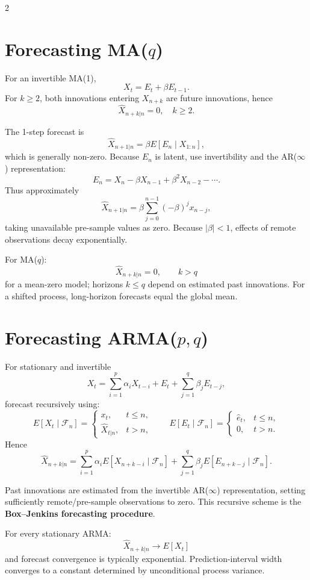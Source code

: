 \documentclass[9pt,a4paper]{extarticle}
\newcommand{\key}[1]{\textbf{#1}}
\begin{document}
\begin{multicols}{2}
\section{Forecasting MA($q$)}

For an invertible MA(1),
\[
X_t=E_t+\beta E_{t-1}.
\]
For \(k\ge2\), both innovations entering \(X_{n+k}\) are future innovations, hence
\[
\boxed{\widehat X_{n+k|n}=0,\quad k\ge2.}
\]

The 1-step forecast is
\[
\widehat X_{n+1|n}
=\beta E[E_n\mid X_{1:n}],
\]
which is generally non-zero. Because \(E_n\) is latent, use invertibility and the AR($\infty$) representation:
\[
E_n=X_n-\beta X_{n-1}
+\beta^2X_{n-2}-\cdots.
\]
Thus approximately
\[
\boxed{
\widehat X_{n+1|n}
=
\beta
\sum_{j=0}^{n-1}
(-\beta)^j x_{n-j},
}
\]
taking unavailable pre-sample values as zero. Because \(|\beta|<1\), effects of remote observations decay exponentially.

For MA($q$):
\[
\boxed{\widehat X_{n+k|n}=0,\qquad k>q}
\]
for a mean-zero model; horizons \(k\le q\) depend on estimated past innovations. For a shifted process, long-horizon forecasts equal the global mean.

\section{Forecasting ARMA($p,q$)}

For stationary and invertible
\[
X_t=
\sum_{i=1}^{p}\alpha_iX_{t-i}
+E_t+
\sum_{j=1}^{q}\beta_jE_{t-j},
\]
forecast recursively using:
\[
E[X_t\mid\mathcal F_n]
=
\begin{cases}
x_t,&t\le n,\\
\widehat X_{t|n},&t>n,
\end{cases}
\qquad
E[E_t\mid\mathcal F_n]
=
\begin{cases}
\widehat e_t,&t\le n,\\
0,&t>n.
\end{cases}
\]
Hence
\[
\boxed{
\widehat X_{n+k|n}
=
\sum_{i=1}^{p}\alpha_i
E[X_{n+k-i}\mid\mathcal F_n]
+
\sum_{j=1}^{q}\beta_j
E[E_{n+k-j}\mid\mathcal F_n].
}
\]

Past innovations are estimated from the invertible AR($\infty$) representation, setting sufficiently remote/pre-sample observations to zero. This recursive scheme is the \key{Box--Jenkins forecasting procedure}.

For every stationary ARMA:
\[
\boxed{\widehat X_{n+k|n}\to E[X_t]}
\]
and forecast convergence is typically exponential. Prediction-interval width converges to a constant determined by unconditional process variance.


\end{multicols}
\end{document}
